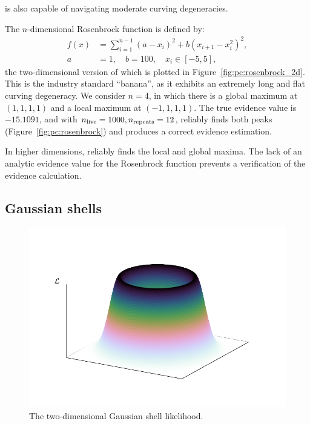 \PolyChord{} is also capable of navigating moderate curving degeneracies. 

The \(n\)-dimensional Rosenbrock function is defined by:
\begin{align}
  f(x) &= \sum\limits_{i=1}^{n-1}   {(a-x_i)}^2+ b {(x_{i+1} -x_i^2 )}^2,
    \label{eqn:pc:rosenbrock}
    \\
    a&=1,\quad b=100,\quad x_i\in[-5,5],
\end{align}
the two-dimensional version of which is plotted in Figure~\ref{fig:pc:rosenbrock_2d}. This is the industry standard ``banana'', as it exhibits an extremely long and flat curving degeneracy. We consider \({n=4}\), in which there is a global maximum at \((1,1,1,1)\) and a local maximum at \((-1,1,1,1)\). The true evidence value is \(-15.1091\), and with \(n_{\mathrm{live}}=1000,n_{\mathrm{repeats}}=12\), \PolyChord{} reliably finds both peaks (Figure~\ref{fig:pc:rosenbrock}) and produces a correct evidence estimation.

In higher dimensions, \PolyChord{} reliably finds the local and global maxima. The lack of an analytic evidence value for the Rosenbrock function prevents a verification of the evidence calculation.

\subsection{Gaussian shells}
\label{sec:pc:gaussian_shells}


\begin{figure}[tp]
  \centering
  \includegraphics[width=\columnwidth]{chapters/polychord/figures/gaussian_shell}
  \caption{The two-dimensional Gaussian shell likelihood.}\label{fig:pc:gaussian_shell}
\end{figure}

